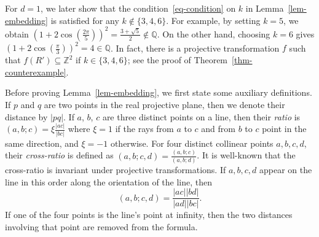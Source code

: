 \documentclass{article}
\begin{document}
For $d=1$, we later show that the condition~\eqref{eq-condition} on $k$ in Lemma~\ref{lem-embedding} is satisfied for any $k \notin \{3,4,6\}$.
For example, by setting $k=5$, we obtain $\left(1+2\cos\left(\frac{2\pi}{5}\right)\right)^2 = \frac{3+\sqrt{5}}{2} \notin \mathbb{Q}$.
On the other hand, choosing $k=6$ gives $\left(1+2\cos\left(\frac{\pi}{3}\right)\right)^2 = 4 \in \mathbb{Q}$.
In fact, there is a projective transformation $f$ such that $f(R') \subseteq \mathbb{Z}^2$ if $k \in \{3,4,6\}$; see the proof of Theorem~\ref{thm-counterexample}.

Before proving Lemma~\ref{lem-embedding}, we first state some auxiliary definitions.
If $p$ and $q$ are two points in the real projective plane, then we denote their distance by $|pq|$. 
If $a$, $b$, $c$ are three distinct points on a line, then their \emph{ratio} is $(a, b; c) = \xi\frac{|ac|}{|bc|}$ where $\xi=1$ if the rays from $a$ to $c$ and from $b$ to $c$ point in the same direction, and $\xi=-1$ otherwise.
For four distinct collinear points $a,b,c,d$, their \emph{cross-ratio} is defined as
$(a,b;c,d) = \frac{(a,b;c)}{(a,b;d)}$. 
It is well-known that the cross-ratio is invariant under projective transformations.
If $a,b,c,d$ appear on the line in this order along the orientation of the line, then
\[(a,b;c,d) = \frac{|ac||bd|}{|ad||bc|}.\]
If one of the four points is the line's point at infinity, then the two distances involving that point are removed from the formula.
\end{document}
